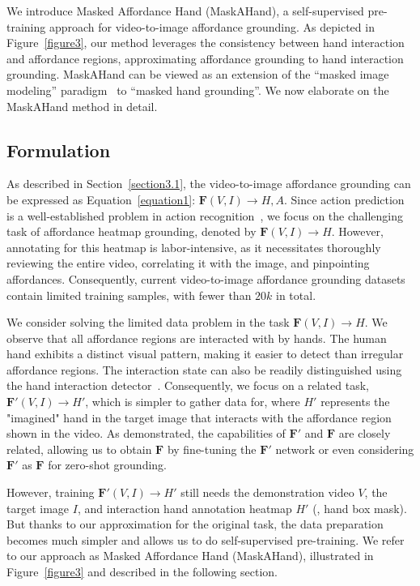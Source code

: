 \documentclass[10pt,twocolumn,letterpaper]{article}
\begin{document}
We introduce Masked Affordance Hand (MaskAHand), a self-supervised pre-training approach for video-to-image affordance grounding. As depicted in Figure~\ref{figure3}, our method leverages the consistency between hand interaction and affordance regions, approximating affordance grounding to hand interaction grounding. MaskAHand can be viewed as an extension of the ``masked image modeling'' paradigm~\cite{maskfeat,mae,oatrans} to ``masked hand grounding''. We now elaborate on the MaskAHand method in detail.

\subsection{Formulation} \label{section4.1}

As described in Section~\ref{section3.1}, the video-to-image affordance grounding can be expressed as Equation~\ref{equation1}: $\mathbf{F}(V, I) \rightarrow H, A$. 
Since action prediction is a well-established problem in action recognition~\cite{kinetics400,c3d,slowfast,stmae,morphmlp}, we focus on the challenging task of affordance heatmap grounding, denoted by $\boldsymbol{F}(V, I) \rightarrow H$. However, annotating for this heatmap is labor-intensive, as it necessitates thoroughly reviewing the entire video, correlating it with the image, and pinpointing affordances. Consequently, current video-to-image affordance grounding datasets contain limited training samples, with fewer than $20k$ in total.

We consider solving the limited data problem in the task $\boldsymbol{F}(V, I) \rightarrow H$. We observe that all affordance regions are interacted with by hands. The human hand exhibits a distinct visual pattern, making it easier to detect than irregular affordance regions. The interaction state can also be readily distinguished using the hand interaction detector~\cite{100doh}. Consequently, we focus on a related task, $\boldsymbol{F'}(V,I) \rightarrow H'$, which is simpler to gather data for, where $H'$ represents the "imagined" hand in the target image that interacts with the affordance region shown in the video. As demonstrated, the capabilities of $\boldsymbol{F'}$ and $\boldsymbol{F}$ are closely related, allowing us to obtain $\boldsymbol{F}$ by fine-tuning the $\boldsymbol{F'}$ network or even considering $\boldsymbol{F'}$ as $\boldsymbol{F}$ for zero-shot grounding.

However, training $\boldsymbol{F'}(V,I)\rightarrow H'$ still needs the demonstration video $V$, the target image $I$, and interaction hand annotation heatmap $H'$ (\eg, hand box mask). But thanks to our approximation for the original task, the data preparation becomes much simpler and allows us to do self-supervised pre-training. We refer to our approach as Masked Affordance Hand (MaskAHand), illustrated in Figure~\ref{figure3} and described in the following section.
\end{document}
